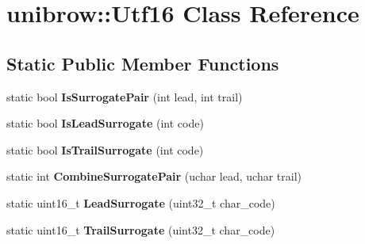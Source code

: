 \hypertarget{classunibrow_1_1_utf16}{}\section{unibrow\+:\+:Utf16 Class Reference}
\label{classunibrow_1_1_utf16}
\subsection*{Static Public Member Functions}
\begin{DoxyCompactItemize}
\item 
static bool {\bfseries Is\+Surrogate\+Pair} (int lead, int trail)\hypertarget{classunibrow_1_1_utf16_a8ab0761452dd5c57d5a90c6af999b5d7}{}\label{classunibrow_1_1_utf16_a8ab0761452dd5c57d5a90c6af999b5d7}

\item 
static bool {\bfseries Is\+Lead\+Surrogate} (int code)\hypertarget{classunibrow_1_1_utf16_ada29066756f075feb4786ec1b6d50f71}{}\label{classunibrow_1_1_utf16_ada29066756f075feb4786ec1b6d50f71}

\item 
static bool {\bfseries Is\+Trail\+Surrogate} (int code)\hypertarget{classunibrow_1_1_utf16_abb3a01f7302f952deaad31b667fd83a8}{}\label{classunibrow_1_1_utf16_abb3a01f7302f952deaad31b667fd83a8}

\item 
static int {\bfseries Combine\+Surrogate\+Pair} (uchar lead, uchar trail)\hypertarget{classunibrow_1_1_utf16_aac66a94947867b52f783c206f7f798ac}{}\label{classunibrow_1_1_utf16_aac66a94947867b52f783c206f7f798ac}

\item 
static uint16\+\_\+t {\bfseries Lead\+Surrogate} (uint32\+\_\+t char\+\_\+code)\hypertarget{classunibrow_1_1_utf16_a01bbf2bab943780510481b14565039b5}{}\label{classunibrow_1_1_utf16_a01bbf2bab943780510481b14565039b5}

\item 
static uint16\+\_\+t {\bfseries Trail\+Surrogate} (uint32\+\_\+t char\+\_\+code)\hypertarget{classunibrow_1_1_utf16_a867f66dde6dfd10126ed5dc997caee32}{}\label{classunibrow_1_1_utf16_a867f66dde6dfd10126ed5dc997caee32}

\end{DoxyCompactItemize}

